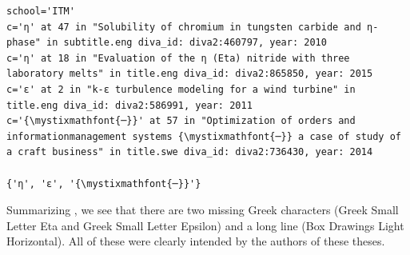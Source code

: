 \documentclass[12pt, twoside]{article}
\begin{document}
\begin{Verbatim}[breaklines=true, commandchars=\\\{\}]
school='ITM'
c='η' at 47 in "Solubility of chromium in tungsten carbide and η-phase" in subtitle.eng diva_id: diva2:460797, year: 2010
c='η' at 18 in "Evaluation of the η (Eta) nitride with three laboratory melts" in title.eng diva_id: diva2:865850, year: 2015
c='ε' at 2 in "k-ε turbulence modeling for a wind turbine" in title.eng diva_id: diva2:586991, year: 2011
c='{\mystixmathfont{─}}' at 57 in "Optimization of orders and informationmanagement systems {\mystixmathfont{─}} a case of study of a craft business" in title.swe diva_id: diva2:736430, year: 2014

{'η', 'ε', '{\mystixmathfont{─}}'}
\end{Verbatim}
\FloatBarrier
Summarizing , we see that there are two missing Greek characters (Greek Small Letter Eta and Greek Small Letter Epsilon) and a long line (\ie Box Drawings Light Horizontal). All of these were clearly intended by the authors of these theses.
\clearpage
\begin{lstlisting}[style=latexExampleForAuthors,  escapechar=|, 
caption={Part of the output about characters missing from Figtree that are actually used in \gls{DiVA} in English and Swedish titles and subtitles - for the SCI school.},
label=lst:missingFigtreeSCI]
\end{lstlisting}
\end{document}
